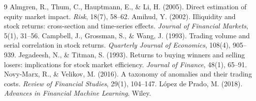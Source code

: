 \documentclass[11pt,a4paper]{article}
\begin{document}
\begin{thebibliography}{9}
 Almgren, R., Thum, C., Hauptmann, E., \& Li, H. (2005).
Direct estimation of equity market impact. \emph{Risk}, 18(7), 58--62.
 Amihud, Y. (2002). Illiquidity and stock returns: cross-section
and time-series effects. \emph{Journal of Financial Markets}, 5(1), 31--56.
 Campbell, J., Grossman, S., \& Wang, J. (1993).
Trading volume and serial correlation in stock returns. \emph{Quarterly Journal of Economics},
108(4), 905--939.
 Jegadeesh, N., \& Titman, S. (1993). Returns to
buying winners and selling losers: implications for stock market efficiency. \emph{Journal of
Finance}, 48(1), 65--91.
 Novy-Marx, R., \& Velikov, M. (2016). A taxonomy of
anomalies and their trading costs. \emph{Review of Financial Studies}, 29(1), 104--147.
 L\'opez de Prado, M. (2018). \emph{Advances in Financial
Machine Learning}. Wiley.
\end{thebibliography}
\end{document}
